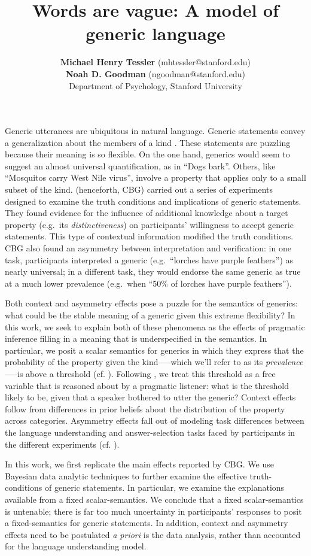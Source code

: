 \documentclass[11pt,letterpaper]{article}
\title{Words are vague: A model of generic language}
\author{{\large \bf Michael Henry Tessler} (mhtessler@stanford.edu)\\
{\large \bf Noah D. Goodman} (ngoodman@stanford.edu) \\
  Department of Psychology, Stanford University}
\begin{document}
\maketitle


Generic utterances are ubiquitous in natural language. Generic statements convey a generalization about the members of a kind \cite{Carlson1977, Leslie2008}. These statements are puzzling because their meaning is so flexible. On the one hand, generics would seem to suggest an almost universal quantification, as in ``Dogs bark''. Others, like ``Mosquitos carry West Nile virus'', involve a property that applies only to a small subset of the kind. 
 (henceforth, CBG) carried out a series of experiments designed to examine the truth conditions and implications of generic statements. 
They found evidence for the influence of additional knowledge about a target property (e.g.~its \emph{distinctiveness}) on participants' willingness to accept generic statements. This type of contextual information modified the truth conditions. CBG also found an asymmetry between interpretation and verification: in one task, participants interpreted a generic (e.g.~``lorches have purple feathers'') as nearly universal; in a different task, they would endorse the same generic as true at a much lower prevalence (e.g.~when ``50\% of lorches have purple feathers'').

Both context and asymmetry effects pose a puzzle for the semantics of generics: what could be the stable meaning of a generic given this extreme flexibility? 
In this work, we seek to explain both of these phenomena as the effects of pragmatic inference filling in a meaning that is underspecified in the semantics. 
In particular, we posit a scalar semantics for generics in which they express that the probability of the property given the kind-----which we'll refer to as its \emph{prevalence}-----is above a threshold (cf. ). Following , we treat this threshold as a free variable that is reasoned about by a pragmatic listener: what is the threshold likely to be, given that a speaker bothered to utter the generic? Context effects follow from differences in prior beliefs about the distribution of the property across categories. Asymmetry effects fall out of modeling task differences between the language understanding and answer-selection tasks faced by participants in the different experiments (cf. ).  


In this work, we first replicate the main effects reported by CBG. We use Bayesian data analytic techniques to further examine the effective truth-conditions of generic statements. In particular, we examine the explanations available from a fixed scalar-semantics. We conclude that a fixed scalar-semantics is untenable; there is far too much uncertainty in participants' responses to posit a fixed-semantics for generic statements. In addition, context and asymmetry effects need to be postulated \emph{a priori} is the data analysis, rather than accounted for the language understanding model.  
\end{document}
